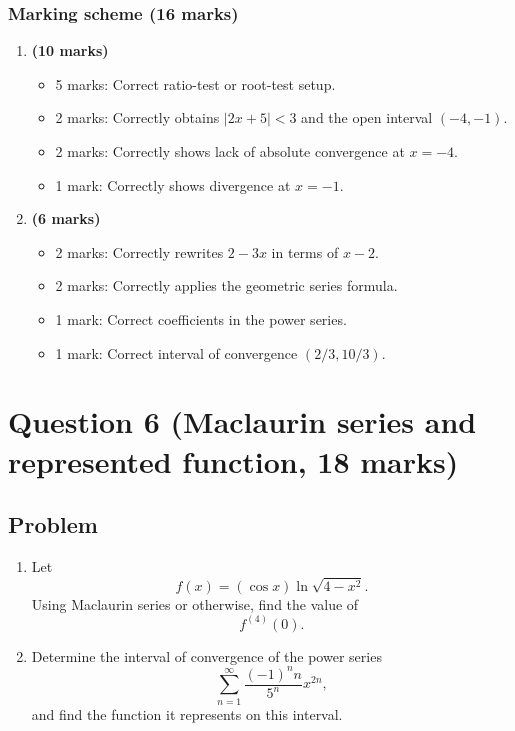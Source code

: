\documentclass[12pt]{article}
\begin{document}
\subsubsection{Marking scheme (16 marks)}

\begin{enumerate}[label=(\alph*)]
\item \textbf{(10 marks)}
\begin{itemize}
\item 5 marks: Correct ratio-test or root-test setup.
\item 2 marks: Correctly obtains $|2x+5|<3$ and the open interval $(-4,-1)$.
\item 2 marks: Correctly shows lack of absolute convergence at $x=-4$.
\item 1 mark: Correctly shows divergence at $x=-1$.
\end{itemize}

\item \textbf{(6 marks)}
\begin{itemize}
\item 2 marks: Correctly rewrites $2-3x$ in terms of $x-2$.
\item 2 marks: Correctly applies the geometric series formula.
\item 1 mark: Correct coefficients in the power series.
\item 1 mark: Correct interval of convergence $(2/3,10/3)$.
\end{itemize}
\end{enumerate}

\newpage
\section{Question 6 (Maclaurin series and represented function, 18 marks)}

\subsection{Problem}

\begin{enumerate}[label=(\alph*)]
\item Let
\[
f(x)=(\cos x)\ln\sqrt{4-x^2}.
\]
Using Maclaurin series or otherwise, find the value of
\[
f^{(4)}(0).
\]

\item Determine the interval of convergence of the power series
\[
\sum_{n=1}^{\infty}\frac{(-1)^n n}{5^n}x^{2n},
\]
and find the function it represents on this interval.
\end{enumerate}
\end{document}
